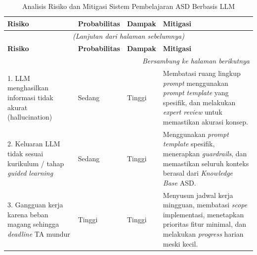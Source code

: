 \begin{longtable}{|p{3.5cm}|p{2cm}|p{1.5cm}|p{5.5cm}|}
\caption{Analisis Risiko dan Mitigasi Sistem Pembelajaran ASD Berbasis LLM} \\
\hline
\textbf{Risiko} & \textbf{Probabilitas} & \textbf{Dampak} & \textbf{Mitigasi} \\
\hline
\endfirsthead

\multicolumn{4}{c}{\textit{(Lanjutan dari halaman sebelumnya)}} \\
\hline
\textbf{Risiko} & \textbf{Probabilitas} & \textbf{Dampak} & \textbf{Mitigasi} \\
\hline
\endhead

\hline \multicolumn{4}{r}{\textit{Bersambung ke halaman berikutnya}} \\
\endfoot

\hline
\endlastfoot

1. LLM menghasilkan informasi tidak akurat (hallucination) 
& Sedang 
& Tinggi 
& Membatasi ruang lingkup \textit{prompt} menggunakan \textit{prompt template} yang spesifik, dan melakukan \textit{expert review} untuk memastikan akurasi konsep. \\
\hline

2. Keluaran LLM tidak sesuai kurikulum / tahap \textit{guided learning}
& Sedang
& Tinggi
& Menggunakan \textit{prompt template} spesifik, menerapkan \textit{guardrails}, dan memastikan seluruh konteks berasal dari \textit{Knowledge Base} ASD. \\
\hline

3. Gangguan kerja karena beban magang sehingga \textit{deadline} TA mundur
& Tinggi
& Tinggi
& Menyusun jadwal kerja mingguan, membatasi \textit{scope} implementasi, menetapkan prioritas fitur minimal, dan melakukan \textit{progress} harian meski kecil. \\
\hline

\end{longtable}
